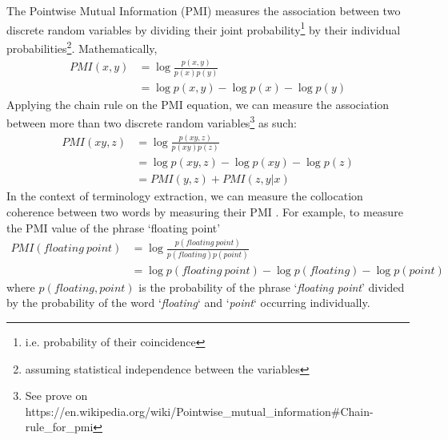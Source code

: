 The Pointwise Mutual Information (PMI) measures the association between two discrete random variables by dividing their joint probability\footnote{i.e. probability of their coincidence} by their individual probabilities\footnote{assuming statistical independence between the variables}. Mathematically,
\vspace{-2mm}
\begin{equation}
\begin{split}
PMI(x,y) & =\log { \frac { p(x,y) }{ p(x)p(y) }  } \\
         & =\log { p(x,y) } -\log { p(x) } -\log { p(y) } 
\end{split}
\end{equation}
\vspace{-2mm}
Applying the chain rule on the PMI equation, we can measure the association between more than two discrete random variables\footnote{See prove on https://en.wikipedia.org/wiki/Pointwise\_mutual\_information\#Chain-rule\_for\_pmi} as such:
\vspace{-2mm}
\begin{equation}
\begin{split}
PMI(xy,z) & =\log { \frac { p(xy,z) }{ p(xy)p(z) }  } \\
& =\log { p(xy,z) } -\log { p(xy) } -\log { p(z) } \\ 
& = PMI(y,z)+PMI(z,y|x) 
\end{split}
\end{equation}
\vspace{-2mm}
In the context of terminology extraction, we can measure the collocation coherence between two words by measuring their PMI \cite{bouma2009normalized,eichler2010dfki}.  For example, to measure the PMI value of the phrase `floating point' 
\vspace{-2mm}
\begin{equation}
\begin{split}
PMI(floating \ point) & =\log { \frac { p(floating \ point) }{ p(floating)p(point) }  } \\
& =\log { p(floating \ point) } -\log { p(floating) } -\log { p(point) } 
\end{split}
\end{equation}
\vspace{-2mm}
where $p(floating,point)$ is the probability of the phrase `\textit{floating point}' divided by the probability of the word `\textit{floating}` and `\textit{point}` occurring individually.

